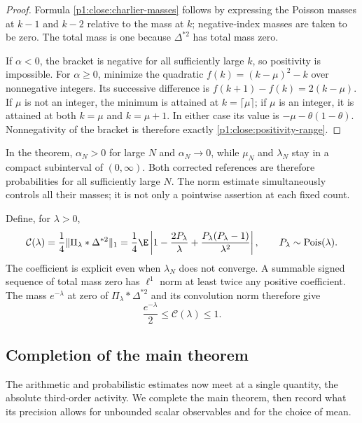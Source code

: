 \begin{proof}
Formula \eqref{p1:close:charlier-masses} follows by expressing
the Poisson masses at $k-1$ and $k-2$ relative to the mass
at $k$; negative-index masses are taken to be zero.
The total mass is one because $\Delta^{*2}$ has total mass
zero.

If $\alpha<0$, the bracket is negative for all sufficiently
large $k$, so positivity is impossible.
For $\alpha\ge0$, minimize the quadratic
$f(k)=(k-\mu)^2-k$ over nonnegative integers.
Its successive difference is $f(k+1)-f(k)=2(k-\mu)$.
If $\mu$ is not an integer, the minimum is attained at
$k=\lceil\mu\rceil$; if $\mu$ is an integer, it is attained
at both $k=\mu$ and $k=\mu+1$.  In either case its value is
$-\mu-\theta(1-\theta)$.  Nonnegativity of the bracket
is therefore exactly \eqref{p1:close:positivity-range}.
\end{proof}

In the theorem, $\alpha_N>0$ for large $N$ and $\alpha_N\to0$,
while $\mu_N$ and $\lambda_N$ stay in a compact subinterval
of $(0,\infty)$.  Both corrected references are therefore
probabilities for all sufficiently large $N$.
The norm estimate simultaneously controls all their masses;
it is not only a pointwise assertion at each fixed count.

Define, for $\lambda>0$,
\begin{equation}
 \mathcal C(\lambda)
   =\frac14\|\Pi_\lambda*\Delta^{*2}\|_1
   =\frac14\E\left|
       1-\frac{2P_\lambda}{\lambda}
          +\frac{P_\lambda(P_\lambda-1)}{\lambda^2}
                   \right|,
 \qquad P_\lambda\sim\operatorname{Pois}(\lambda).
 \label{p1:close:charlier-constant}
\end{equation}
The coefficient is explicit even when $\lambda_N$ does not
converge. A summable signed sequence of total mass zero has
$\ell^1$ norm at least twice any positive coefficient. The mass
$e^{-\lambda}$ at zero of $\Pi_\lambda*\Delta^{*2}$ and its
convolution norm therefore give
\begin{equation}
 \frac{e^{-\lambda}}2\le\mathcal C(\lambda)\le1.
 \label{p1:close:constant-bounds}
\end{equation}

\subsection{Completion of the main theorem}
\label{p13:optimal:section}

The arithmetic and probabilistic estimates now meet at a
single quantity, the absolute third-order activity.
We complete the main theorem, then record what its precision
allows for unbounded scalar observables and for the choice
of mean.

